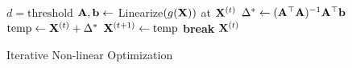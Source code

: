 
\begin{algorithm}[htpb]
\begin{algorithmic}[1]
    \State $d = \text{threshold}$
        \State $\mathbf{A}, \mathbf{b} \leftarrow$ Linearize$(g(\mathbf{X}))$ at $\mathbf{X}^{(t)}$
        \State $\Delta^* \leftarrow (\mathbf{A}^\top \mathbf{A})^{-1} \mathbf{A}^\top \mathbf{b}$ 
        \State $\text{temp} \leftarrow \mathbf{X}^{(t)} + \Delta^*$
            \State $\mathbf{X}^{(t+1)} \leftarrow \text{temp}$
                \State \textbf{break}
            \EndIf
        \EndIf
    \EndFor
    \State \Return $\mathbf{X}^{(t)}$
\EndProcedure
\end{algorithmic}
\caption[short caption]{Iterative Non-linear Optimization}
\label{gauss-newton}
\end{algorithm}
